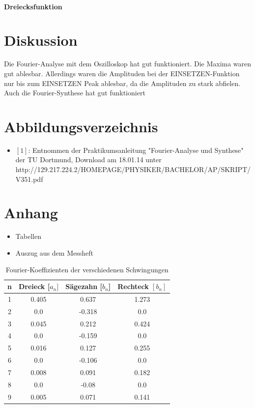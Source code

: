 \documentclass[11pt,ngerman,a4paper]{article}
\begin{document}
\paragraph{Dreiecksfunktion}
\paragraph{}

\section{Diskussion}
Die Fourier-Analyse mit dem Oszilloskop hat gut funktioniert. Die Maxima waren gut ablesbar. Allerdings waren die Amplituden bei der EINSETZEN-Funktion nur bis zum EINSETZEN Peak ablesbar, da die Amplituden zu stark abfielen. Auch die Fourier-Synthese hat gut funktioniert
\section{Abbildungsverzeichnis}
\begin{itemize}
\item $[1]$: Entnommen der Praktikumsanleitung "Fourier-Analyse und Synthese" der TU Dortmund, Download am 18.01.14 unter http://129.217.224.2/HOMEPAGE/PHYSIKER/BACHELOR/AP/SKRIPT/V351.pdf
\end{itemize}
\section{Anhang}
\begin{itemize}
\item Tabellen
\item Auszug aus dem Messheft
\end{itemize}

\newpage
\begin{table}
\centering
\begin{tabular}{|c|c|c|c|}

\hline
n & Dreieck [$a_n]$ & S\"agezahn [$b_n$] & Rechteck $[b_n]$ \\
\hline
1 & 0.405 & 0.637 & 1.273\\
2 & 0.0 & -0.318 & 0.0\\
3 & 0.045 & 0.212 & 0.424\\
4 & 0.0 & -0.159 & 0.0\\
5 & 0.016 & 0.127 & 0.255\\
6 & 0.0 & -0.106 & 0.0\\
7 & 0.008 & 0.091 & 0.182\\
8 & 0.0 & -0.08 & 0.0\\
9 & 0.005 & 0.071 & 0.141\\
\hline
\end{tabular}
\label{table1}
\caption{Fourier-Koeffizienten der verschiedenen Schwingungen}
\end{table}
\end{document}
